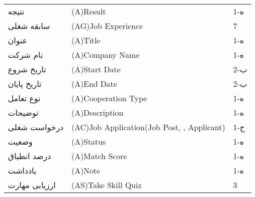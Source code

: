 \documentclass[12pt]{article}
\begin{document}
\begin{table}[]
\begin{tabular}{lll}
			نتیجه                                & (A)Result                                                                                                     & 1-ه   \\
			سابقه شغلی                           & (AG)Job Experience                                                                                            & 7     \\
			عنوان                                & (A)Title                                                                                                      & 1-ه   \\
			نام شرکت                             & (A)Company Name                                                                                               & 1-ه   \\
			تاریخ شروع                           & (A)Start Date                                                                                                 & 2-ب   \\
			تاریخ پایان                          & (A)End Date                                                                                                   & 2-ب   \\
			نوع تعامل                            & (A)Cooperation Type                                                                                           & 1-ه   \\
			توضیحات                              & (A)Description                                                                                                & 1-ه   \\
			درخواست شغلی                         & (AC)Job Application(Job Post, , Applicant)                                                                    & 1-ج   \\
			وضعیت                                & (A)ُStatus                                                                                                    & 1-ه   \\
			درصد انطباق                          & (A)Match Score                                                                                                & 1-ه   \\
			یادداشت                              & (A)ُNote                                                                                                      & 1-ه   \\
			ارزیابی مهارت                        & (AS)Take Skill Quiz                                                                                           & 3     \\

\end{tabular}
\end{table}
\end{document}
